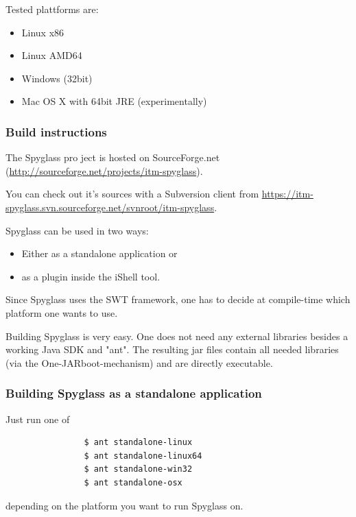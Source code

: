 			Tested plattforms are:

			\begin{itemize}
			  \item Linux x86
			  \item Linux AMD64
			  \item Windows (32bit)
			  \item Mac OS X with 64bit JRE (experimentally)
			\end{itemize}

		\subsubsection{Build instructions}
		
			The Spyglass pro ject is hosted on SourceForge.net
			(\url{http://sourceforge.net/projects/itm-spyglass}).
			
			You can check out it’s sources with a Subversion client from
			\url{https://itm-spyglass.svn.sourceforge.net/svnroot/itm-spyglass}.

			Spyglass can be used in two ways:

			\begin{itemize}
			  \item{Either as a standalone application or}
			  \item{as a plugin inside the iShell tool.}
			\end{itemize}

			Since Spyglass uses the SWT framework, one has to
			decide at compile-time which platform one wants to use.

			Building Spyglass is very easy. One does not need any external
			libraries besides a working Java SDK and "ant".
			The resulting jar files contain all needed libraries (via the
			One-JAR\tm  boot-mechanism) and are directly executable.

		\subsubsection{Building Spyglass as a standalone application}

			Just run one of

			\begin{verbatim}
			    $ ant standalone-linux
			    $ ant standalone-linux64
			    $ ant standalone-win32
			    $ ant standalone-osx
			\end{verbatim}

			depending on the platform you want to run Spyglass on.

